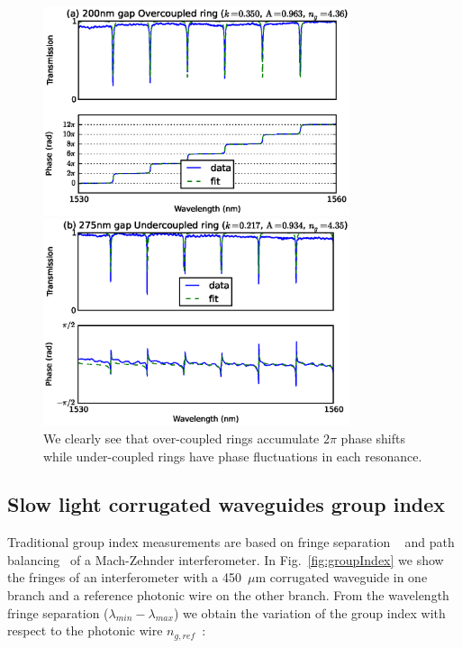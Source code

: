 \documentclass[journal]{IEEEtran}
\begin{document}
\begin{figure}[htb]
  \centerline{\includegraphics[width=9cm]{r20g200TE_fitPhaseAmp}}
  \centerline{\includegraphics[width=9cm]{r20g275TE_fitPhaseAmp}}
  \caption{We clearly see that over-coupled rings accumulate $2\pi$ phase shifts while under-coupled rings have phase fluctuations in each resonance. }
  \label{fig:overcoupled} %
\end{figure}


\subsection{Slow light corrugated waveguides group index}
\label{sec:corrWaveguides}
Traditional group index measurements are based on fringe separation ~\cite{shang81,vlasov:05,yao:811,Dulkeith2006} and path balancing~\cite{Cohen:82,Knox:88,Liang:98} of a Mach-Zehnder interferometer.
In Fig.~\ref{fig:groupIndex} we show the fringes of an interferometer with a 450~$\mu$m corrugated waveguide in one branch and a reference photonic wire on the other branch.
From the wavelength fringe separation ($ \lambda_{min} - \lambda_{max} $) we obtain the variation of the group index with respect to the photonic wire $ n_{g,ref} $~\cite{vlasov:05}:
\end{document}
